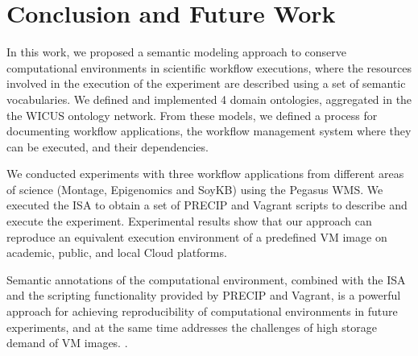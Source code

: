 \section{Conclusion and Future Work}
\label{sec:conclusion}



In this work, we proposed a semantic modeling approach to conserve computational environments in scientific workflow executions, where  the resources involved in the execution of the experiment are described using a set of semantic vocabularies. We defined and implemented 4 domain ontologies, aggregated in the the WICUS ontology network. From these models, we defined a process for documenting workflow applications, the workflow management system where they can be executed, and their dependencies. 

We conducted experiments with three workflow applications from different areas of science (Montage, Epigenomics and SoyKB) using the Pegasus WMS. We executed the ISA to obtain a set of PRECIP and Vagrant scripts to describe and execute the experiment. Experimental results show that our approach can reproduce an equivalent execution environment of a predefined VM image on academic, public, and local Cloud platforms.

Semantic annotations of the computational environment, combined with the ISA and the scripting functionality provided by PRECIP and Vagrant, is a powerful approach for achieving reproducibility of computational environments in future experiments, and at the same time addresses the challenges of high storage demand of VM images. .


